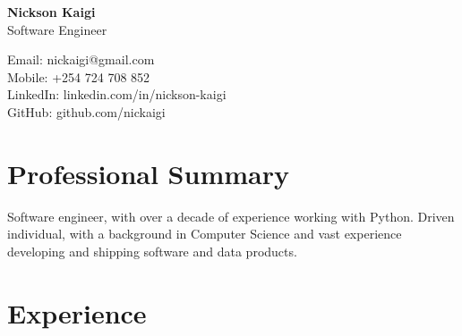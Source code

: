 \documentclass[11pt]{article} %
\begin{document}
\begin{center}
        \begin{minipage}{0.5\textwidth}
                {\Huge\bfseries
                    Nickson Kaigi
                } \\ \medskip
                Software Engineer
        \end{minipage} \hfill
        \begin{minipage}{0.4\textwidth}
                \raggedleft
                Email: nickaigi@gmail.com \\
                Mobile: +254 724 708 852 \\
                LinkedIn: linkedin.com/in/nickson-kaigi \\
                GitHub: github.com/nickaigi
        \end{minipage}
\end{center}

\section{Professional Summary}
Software engineer, with over a decade of experience working with Python. Driven individual, with a background in Computer Science and vast experience developing and shipping software and data products.

\section{Experience}


\end{document}
